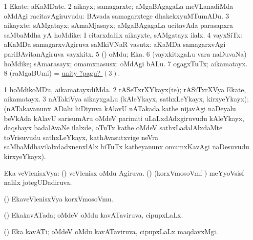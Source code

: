 \bentry
{} 
\gl{\nA}
\bmng
\bnum
\num{1} Ekate; aKaMDate. 
\num{2} aikayx; samagarxte; aMgaBAgagaLa meVLanadiMda oMdAgi racitavAgiruvudu:  BAvada samagarxtege dhakekxyuMTumADu. 
\num{3} aikayxte; sAMgatayx; sAmaMjasayx; aMgaBAgagaLa ucitavAda parasapxra saMbaMdha yA hoMdike:  I citarxdalilx aikayxte, sAMgatayx ilalx. 
\num{4} vayxSiTx: aKaMDa samagarxvAgiruva saMkiVNaR vasutx:  aKaMDa samagarxvAgi pariBAvitanAgiruva vayxkitx. 
\num{5} (\ga) oMdu; Eka. 
\num{6} (vayxkitxgaLu \mo vara naDuvaNa) hoMdike; sAmarasayx; omamxnasusx:  oMdAgi bALu. 
\num{7} ogagxTuTx; aikamatayx. 
\num{8} (raMgaBUmi) = \hyperlink{unity pagu(3)}{unity ?pagu? \((3)\)}. 
\enum
\emng

\noindent
\gl{\pagu}
\expl{}
\bmng
\bnum
\num{1}  hoMdikoMDu, aikamatayxdiMda. 
\num{2}  rASeTxrXYkayx(te); rASiTxrXVya Ekate, aikamatayx. 
\hypertarget{unity pagu(3)}{} 
\num{3}  nATakiVya aikayxgaLu (kAleYkayx, sathxLeYkayx, kirxyeYkayx); (nATakavanunx ADalu hiDiyuva kAlavU nATakada kathe nijavAgi naDeyalu beVkAda kAlavU sarisumAru oMdeV parimiti uLaLxdAdxgiruvudu kAleYkayx, daqshayx badalAvaNe ilalxde, oTuTx kathe oMdeV sathxLadalAlxdaMte toVrisuvudu sathxLeYkayx, kathAvasutxvige neVra saMbaMdhavilalxdadxnenxlAlx biTuTx katheyanunx omumxKavAgi naDesuvudu kirxyeYkayx). 
\enum
\emng
\eentry

\bentry
{}
\gl{\saMkiSx}
\expl{}
\bmng
{} 
\emng
\eentry

\bentry
{} 
\gl{\gu}
\expl{}
\bmng
Eka veVlenisxVya: 
\banum
{} (\ravi) veVlenisx oMdu Agiruva. 
 (\jiVvi) (korxVmosoVmf \vi) meYyoVsisf  nalilx jotegUDadiruva. 
\eanum
\emng
\eentry

\bentry
{} 
\gl{\nA}
\expl{}
\bmng
(\jiVvi) EkaveVlenisxVya korxVmosoVmu. 
\emng
\eentry

\bentry
{} 
\gl{\gu}
\expl{}
\bmng
(\pArxvi) EkakavATada; oMdeV oMdu kavATaviruva, cipupxLaLx. 
\emng
\eentry

\bentry
{} 
\gl{\nA}
\expl{}
\bmng
(\pArxvi) Eka kavATi; oMdeV oMdu kavATaviruva, cipupxLaLx maqdavxMgi. 
\emng
\eentry

